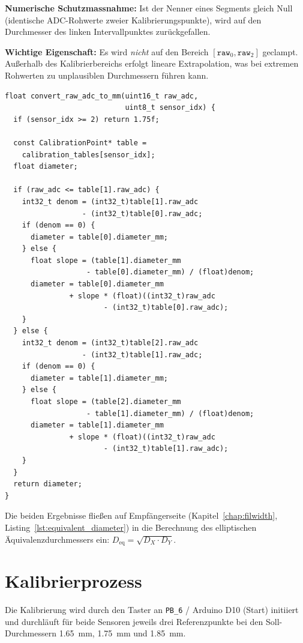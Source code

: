 \textbf{Numerische Schutzmassnahme:} Ist der Nenner eines Segments gleich Null (identische ADC-Rohwerte zweier Kalibrierungspunkte), wird auf den Durchmesser des linken Intervallpunktes zurückgefallen.

\textbf{Wichtige Eigenschaft:} Es wird \emph{nicht} auf den Bereich $[\mathtt{raw}_0, \mathtt{raw}_2]$ geclampt.
Außerhalb des Kalibrierbereichs erfolgt lineare Extrapolation, was bei extremen Rohwerten zu unplausiblen Durchmessern führen kann.

\begin{lstlisting}[style=firmwarestyle, caption={Stückweise lineare Interpolation (\texttt{convert\_raw\_adc\_to\_mm}, Z.~129--156).}, label={lst:sensor_convert_raw}]
float convert_raw_adc_to_mm(uint16_t raw_adc,
                            uint8_t sensor_idx) {
  if (sensor_idx >= 2) return 1.75f;

  const CalibrationPoint* table =
    calibration_tables[sensor_idx];
  float diameter;

  if (raw_adc <= table[1].raw_adc) {
    int32_t denom = (int32_t)table[1].raw_adc
                  - (int32_t)table[0].raw_adc;
    if (denom == 0) {
      diameter = table[0].diameter_mm;
    } else {
      float slope = (table[1].diameter_mm
                   - table[0].diameter_mm) / (float)denom;
      diameter = table[0].diameter_mm
               + slope * (float)((int32_t)raw_adc
                       - (int32_t)table[0].raw_adc);
    }
  } else {
    int32_t denom = (int32_t)table[2].raw_adc
                  - (int32_t)table[1].raw_adc;
    if (denom == 0) {
      diameter = table[1].diameter_mm;
    } else {
      float slope = (table[2].diameter_mm
                   - table[1].diameter_mm) / (float)denom;
      diameter = table[1].diameter_mm
               + slope * (float)((int32_t)raw_adc
                       - (int32_t)table[1].raw_adc);
    }
  }
  return diameter;
}
\end{lstlisting}

Die beiden Ergebnisse fließen auf Empfängerseite (Kapitel~\ref{chap:filwidth}, Listing~\ref{lst:equivalent_diameter}) in die Berechnung des elliptischen Äquivalenzdurchmessers ein:
$D_\text{eq} = \sqrt{D_X \cdot D_Y}$.

\section{Kalibrierprozess}
\label{sec:sensor_kalibrierung}

Die Kalibrierung wird durch den Taster an \texttt{PB\_6} / Arduino D10 (Start) initiiert und durchläuft für beide Sensoren jeweils drei Referenzpunkte bei den Soll-Durchmessern \qty{1,65}{\milli\meter}, \qty{1,75}{\milli\meter} und \qty{1,85}{\milli\meter}.

